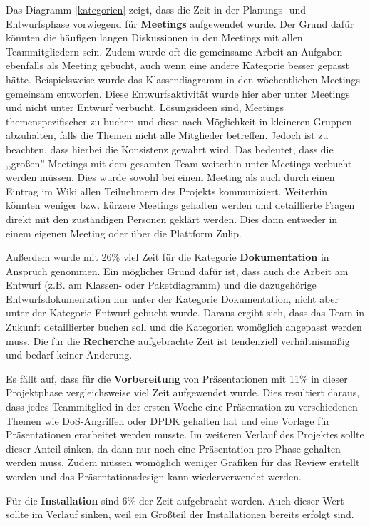 \documentclass[../review_3.tex]{subfiles}
\begin{document}
Das Diagramm \ref{kategorien} zeigt, dass die Zeit in der Planungs- und Entwurfsphase vorwiegend für \textbf{Meetings} aufgewendet wurde. Der Grund dafür könnten die häufigen langen Diskussionen in den Meetings mit allen Teammitgliedern sein. Zudem wurde oft die gemeinsame Arbeit an Aufgaben ebenfalls als Meeting gebucht, auch wenn eine andere Kategorie besser gepasst hätte. Beispielsweise wurde das Klassendiagramm in den wöchentlichen Meetings gemeinsam entworfen. Diese Entwurfsaktivität wurde hier aber unter Meetings und nicht unter Entwurf verbucht. Lösungsideen sind, Meetings themenspezifischer zu buchen und diese nach Möglichkeit in kleineren Gruppen abzuhalten, falls die Themen nicht alle Mitglieder betreffen. Jedoch ist zu beachten, dass hierbei die Konsistenz gewahrt wird. Das bedeutet, dass die ,,großen'' Meetings mit dem gesamten Team weiterhin unter Meetings verbucht werden müssen. Dies wurde sowohl bei einem Meeting als auch durch einen Eintrag im Wiki allen Teilnehmern des Projekts kommuniziert. Weiterhin könnten weniger bzw. kürzere Meetings gehalten werden und detaillierte Fragen direkt mit den zuständigen Personen geklärt werden. Dies dann entweder in einem eigenen Meeting oder über die Plattform Zulip.

Außerdem wurde mit 26\% viel Zeit für die Kategorie \textbf{Dokumentation} in Anspruch genommen. Ein möglicher Grund dafür ist, dass auch die Arbeit am Entwurf (z.B. am Klassen- oder Paketdiagramm) und die dazugehörige Entwurfsdokumentation nur unter der Kategorie Dokumentation, nicht aber unter der Kategorie Entwurf gebucht wurde. Daraus ergibt sich, dass das Team in Zukunft detaillierter buchen soll und die Kategorien womöglich angepasst werden muss.
Die für die \textbf{Recherche} aufgebrachte Zeit ist tendenziell verhältnismäßig und bedarf keiner Änderung.

Es fällt auf, dass für die \textbf{Vorbereitung} von Präsentationen  mit 11\% in dieser Projektphase vergleichsweise viel Zeit aufgewendet wurde. Dies resultiert daraus, dass jedes Teammitglied in der ersten Woche eine Präsentation zu verschiedenen Themen wie DoS-Angriffen oder DPDK gehalten hat und eine Vorlage für Präsentationen erarbeitet werden musste. Im weiteren Verlauf des Projektes sollte dieser Anteil sinken, da dann nur noch eine Präsentation pro Phase gehalten werden muss. Zudem müssen womöglich weniger Grafiken für das Review erstellt werden und das Präsentationsdesign kann wiederverwendet werden.

Für die \textbf{Installation} sind 6\% der Zeit aufgebracht worden. Auch dieser Wert sollte im Verlauf sinken, weil ein Großteil der Installationen bereits erfolgt sind.
\end{document}
